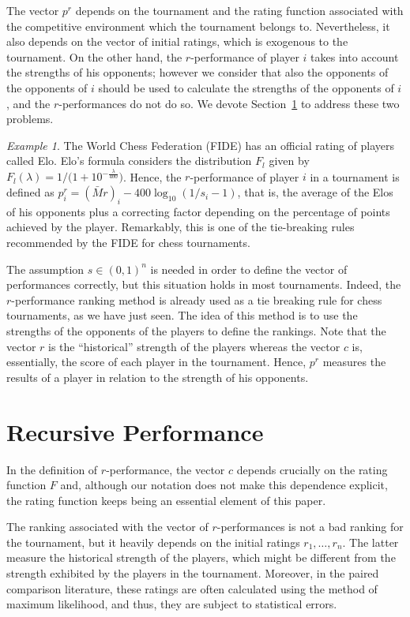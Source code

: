 \documentclass[a4paper,10pt]{article}
\theoremstyle{remark}
\newtheorem{example}{Example}
\newcommand{\MM}{M} %
\newcommand{\rv}{r} %
\newcommand{\pv}{p} %
\newcommand{\sv}{s} %
\begin{document}
The vector $\pv^\rv$ depends on the tournament and the rating
function associated with the competitive environment which the
tournament belongs to. Nevertheless, it also depends on the vector of initial ratings, which is exogenous to the tournament. On the
other hand, the $\rv$-performance of player $i$ takes into account
the strengths of his opponents; however we consider that also the
opponents of the opponents of $i$ should be used to calculate the
strengths of the opponents of $i$, and the $\rv$-performances do
not do so. We devote Section~\ref{scRecursivePerformance} to
address these two problems.

\begin{example}
The World Chess Federation (FIDE) has an official rating of
players called Elo. Elo's formula considers the distribution $F_l$
given by $F_l(\lambda)=1/\bigl(1+10^{-\frac{\lambda}{400}}\bigr)$. Hence, the
$\rv$-performance of player $i$ in a tournament is defined as $\pv^\rv_i=(\bar{\MM}\rv)_i-400\log_{10}(1/\sv_i-1)$, that is, the average of the Elos of his opponents plus a
correcting factor depending on the percentage of points achieved
by the player. Remarkably, this is one of the tie-breaking rules
recommended by the FIDE for chess tournaments.
\end{example}

The assumption $\sv \in (0,1)^n$ is needed in order to define the vector of performances correctly,
but this situation holds in most tournaments. Indeed, the $\rv$-performance ranking method is already used as a
tie breaking rule for chess tournaments, as we have just seen. The
idea of this method is to use the strengths of the opponents of
the players to define the rankings. Note that the vector $\rv$ is
the ``historical'' strength of the players whereas the vector $c$
is, essentially, the score of each player in the tournament.
Hence, $\pv^\rv$ measures the results of a player in relation
to the strength of his opponents.

\section{Recursive Performance}\label{scRecursivePerformance}

In the definition of $\rv$-performance, the vector $c$ depends crucially on
the rating function $F$ and, although our notation does not make
this dependence explicit, the rating function keeps being an
essential element of this paper.

The ranking associated with the vector of $\rv$-performances is
not a bad ranking for the tournament, but it heavily depends on
the initial ratings $\rv_1,\ldots,\rv_n$. The latter measure the
historical strength of the players, which might be different from
the strength exhibited by the players in the tournament. Moreover,
in the paired comparison literature, these ratings are often
calculated using the method of maximum likelihood, and thus, they
are subject to statistical errors.
\end{document}
